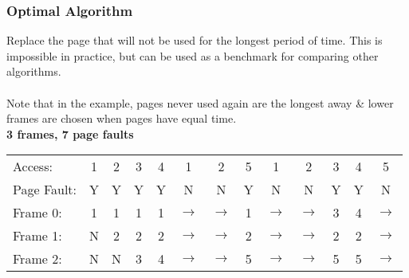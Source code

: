 \documentclass{report}
\begin{document}
            \subsubsection*{Optimal Algorithm}
                Replace the page that will not be used for the longest period of time. This is impossible in practice, but can be used as a benchmark for comparing other algorithms.
                \\
                \\ Note that in the example, pages never used again are the longest away \& lower frames are chosen when pages have equal time. 
                \\ \textbf{3 frames, 7 page faults}
                \begin{center}
                    \begin{tabular}{l c c c c c c c c c c c c}
                        Access:     & 1 & 2 & 3 & 4 & 1 & 2 & 5 & 1 & 2 & 3 & 4 & 5 \\
                        Page Fault: & Y & Y & Y & Y & N & N & Y & N & N & Y & Y & N \\
                        Frame 0:    & 1 & 1 & 1 & 1 & $\to$ & $\to$ & 1 & $\to$ & $\to$ & 3 & 4 & $\to$ \\
                        Frame 1:    & N & 2 & 2 & 2 & $\to$ & $\to$ & 2 & $\to$ & $\to$ & 2 & 2 & $\to$ \\
                        Frame 2:    & N & N & 3 & 4 & $\to$ & $\to$ & 5 & $\to$ & $\to$ & 5 & 5 & $\to$ \\
                    \end{tabular}
                \end{center}





            
        
\end{document}
